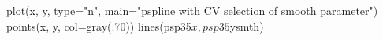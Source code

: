 \begin{Schunk}
\begin{Sinput}
 plot(x, y, type="n", main="pspline with CV selection of smooth parameter")
 points(x, y, col=gray(.70))
 lines(psp35$x, psp35$ysmth)
\end{Sinput}
\end{Schunk}
